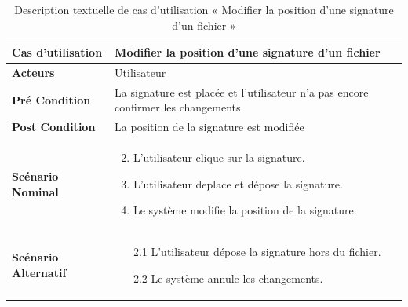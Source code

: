 \begin{longtable}{|p{5cm}|p{10cm}|}
  \caption{Description textuelle de cas d'utilisation « Modifier la position d'une signature d'un fichier »} \label{tab:description-textuelle-de-cas-d-utilisation-modifier-la-position-d-une-signature-d-un-fichier} \\
\hline
\textbf{Cas d'utilisation}&Modifier la position d'une signature d'un fichier\\
\hline
\textbf{Acteurs}&Utilisateur\\
\hline
\textbf{Pré Condition}&La signature est placée et l'utilisateur n'a pas encore confirmer les changements\\
\hline
\textbf{Post Condition}&La position de la signature est modifiée\\
\hline
\textbf{Scénario Nominal}&
\vspace{-\baselineskip}
\begin{enumerate}
    \setcounter{enumi}{1}
    \item L'utilisateur clique sur la signature.
    \item L'utilisateur deplace et dépose la signature.
    \item Le système modifie la position de la signature.
\end{enumerate}\\
\hline
\textbf{Scénario Alternatif}&
\vspace{-\baselineskip}
\begin{enumerate}
    \item [2.1]L'utilisateur dépose la signature hors du fichier.
    \item [2.2]Le système annule les changements.
\end{enumerate}\\
\hline

\end{longtable}


